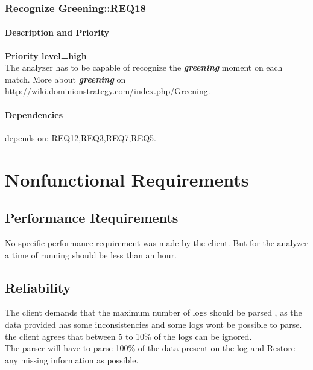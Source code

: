 \documentclass{scrreprt}
\begin{document}
\subsection{Recognize Greening::REQ18}
\subsubsection{Description and Priority}
\textbf{Priority level=high}\\
The analyzer has to be capable of recognize the \textit{\textbf{greening}} moment on each match.
More about \textit{\textbf{greening}} on \url{http://wiki.dominionstrategy.com/index.php/Greening}.
\subsubsection{Dependencies}
depends on: REQ12,REQ3,REQ7,REQ5.


\chapter{Nonfunctional Requirements}

\section{Performance Requirements}
No specific performance requirement was made by the client. But for the analyzer
a time of running should be less than an hour.



\section{Reliability}
The client demands that the maximum number of logs should be parsed , as the
data provided has some inconsistencies and some logs wont be possible to parse.
the client agrees that between 5 to 10\% of the logs can be ignored.\\

The parser will have to parse 100\% of the data present on the log and Restore
any missing information as possible.\\
\end{document}
